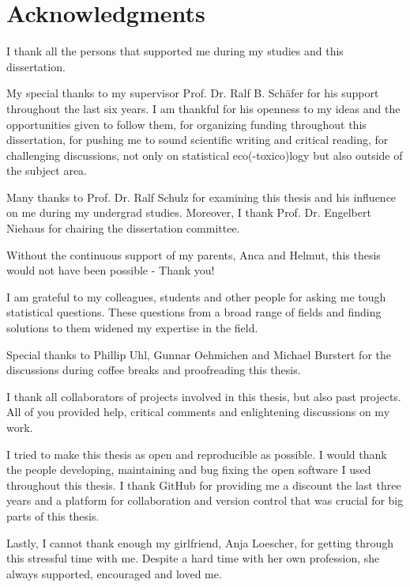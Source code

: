 


\begingroup
\let\clearpage\relax
\let\cleardoublepage\relax
\let\cleardoublepage\relax

\chapter*{Acknowledgments}
\thispagestyle{empty}

I thank all the persons that supported me during my studies and this dissertation.

\noindent My special thanks to my supervisor Prof. Dr. Ralf B. Schäfer for his support throughout the last six years. 
I am thankful for his openness to my ideas and the opportunities given to follow them, 
for organizing funding throughout this dissertation, 
for pushing me to sound scientific writing and critical reading, 
for challenging discussions, not only on statistical eco(-toxico)logy but also outside of the subject area.

\noindent Many thanks to Prof. Dr. Ralf Schulz for examining this thesis and his influence on me during my undergrad studies.
Moreover, I thank Prof. Dr. Engelbert Niehaus for chairing the dissertation committee.

\noindent Without the continuous support of my parents, Anca and Helmut, this thesis would not have been possible - Thank you!

\noindent I am grateful to my colleagues, students and other people for asking me tough statistical questions. 
These questions from a broad range of fields and finding solutions to them widened my expertise in the field.

\noindent Special thanks to Phillip Uhl, Gunnar Oehmichen and Michael Burstert for the discussions during coffee breaks and proofreading this thesis.

\noindent I thank all collaborators of projects involved in this thesis, but also past projects. All of you provided help, critical comments and enlightening discussions on my work.

\noindent I tried to make this thesis as open and reproducible as possible. I would thank the people developing, maintaining and bug fixing the open software I used throughout this thesis. I thank GitHub for providing me a discount the last three years and a platform for collaboration and version control that was crucial for big parts of this thesis. 

\noindent Lastly, I cannot thank enough my girlfriend, Anja Loescher, for getting through this stressful time with me.
Despite a hard time with her own profession, she always supported, encouraged and loved me. 


\endgroup 
